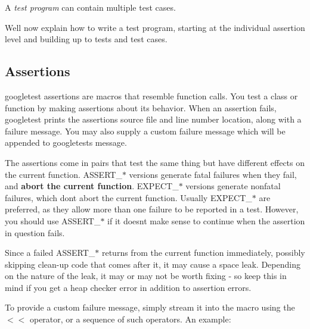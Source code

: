 A {\itshape test program} can contain multiple test cases.

We\textquotesingle{}ll now explain how to write a test program, starting at the individual assertion level and building up to tests and test cases.

\subsection*{Assertions}

googletest assertions are macros that resemble function calls. You test a class or function by making assertions about its behavior. When an assertion fails, googletest prints the assertion\textquotesingle{}s source file and line number location, along with a failure message. You may also supply a custom failure message which will be appended to googletest\textquotesingle{}s message.

The assertions come in pairs that test the same thing but have different effects on the current function. {\ttfamily A\+S\+S\+E\+R\+T\+\_\+$\ast$} versions generate fatal failures when they fail, and {\bfseries{abort the current function}}. {\ttfamily E\+X\+P\+E\+C\+T\+\_\+$\ast$} versions generate nonfatal failures, which don\textquotesingle{}t abort the current function. Usually {\ttfamily E\+X\+P\+E\+C\+T\+\_\+$\ast$} are preferred, as they allow more than one failure to be reported in a test. However, you should use {\ttfamily A\+S\+S\+E\+R\+T\+\_\+$\ast$} if it doesn\textquotesingle{}t make sense to continue when the assertion in question fails.

Since a failed {\ttfamily A\+S\+S\+E\+R\+T\+\_\+$\ast$} returns from the current function immediately, possibly skipping clean-\/up code that comes after it, it may cause a space leak. Depending on the nature of the leak, it may or may not be worth fixing -\/ so keep this in mind if you get a heap checker error in addition to assertion errors.

To provide a custom failure message, simply stream it into the macro using the {\ttfamily $<$$<$} operator, or a sequence of such operators. An example\+:


\begin{DoxyCode}{0}
\DoxyCodeLine{}
\DoxyCodeLine{\}}
\end{DoxyCode}


